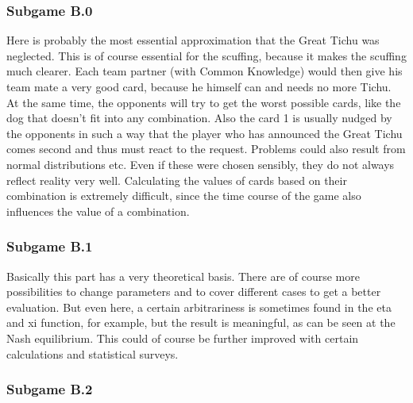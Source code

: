 \subsubsection{Subgame B.0}

Here is probably the most essential approximation that the Great Tichu was neglected. This is of course essential for the scuffing, because it makes the scuffing much clearer. Each team partner (with Common Knowledge) would then give his team mate a very good card, because he himself can and needs no more Tichu. At the same time, the opponents will try to get the worst possible cards, like the dog that doesn't fit into any combination. Also the card 1 is usually nudged by the opponents in such a way that the player who has announced the Great Tichu comes second and thus must react to the request.
Problems could also result from normal distributions etc. Even if these were chosen sensibly, they do not always reflect reality very well. Calculating the values of cards based on their combination is extremely difficult, since the time course of the game also influences the value of a combination.

\subsubsection{Subgame B.1}

Basically this part has a very theoretical basis. There are of course more possibilities to change parameters and to cover different cases to get a better evaluation.
But even here, a certain arbitrariness is sometimes found in the eta and xi function, for example, but the result is meaningful, as can be seen at the Nash equilibrium. This could of course be further improved with certain calculations and statistical surveys.

\subsubsection{Subgame B.2}


